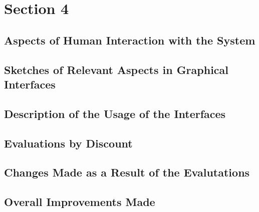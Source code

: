 \chapter{Section 4}
\section{Aspects of Human Interaction with the System}
\section{Sketches of Relevant Aspects in Graphical Interfaces}
\section{Description of the Usage of the Interfaces}
\section{Evaluations by Discount}
\section{Changes Made as a Result of the Evalutations}
\section{Overall Improvements Made}
